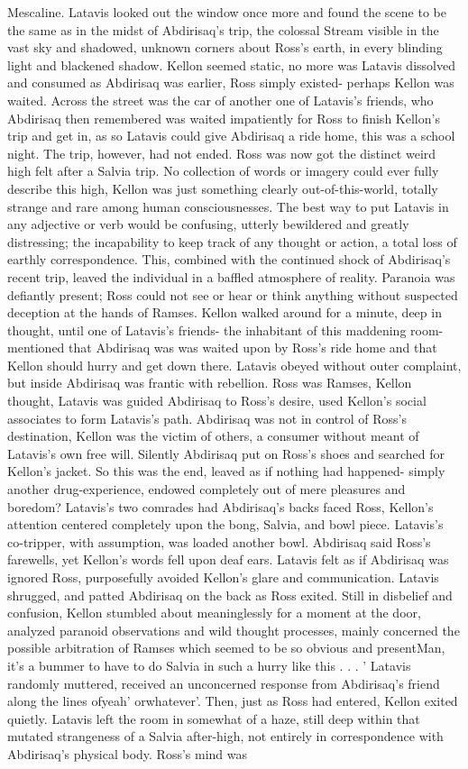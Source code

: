 \documentclass[12pt]{book}
\begin{document}
Mescaline. Latavis looked out the window once more and found the scene to be the same as in the midst of Abdirisaq's trip, the colossal Stream visible in the vast sky and shadowed, unknown corners about Ross's earth, in every blinding light and blackened shadow. Kellon seemed static, no more was Latavis dissolved and consumed as Abdirisaq was earlier, Ross simply existed- perhaps Kellon was waited. Across the street was the car of another one of Latavis's friends, who Abdirisaq then remembered was waited impatiently for Ross to finish Kellon's trip and get in, as so Latavis could give Abdirisaq a ride home, this was a school night. The trip, however, had not ended. Ross was now got the distinct weird high felt after a Salvia trip. No collection of words or imagery could ever fully describe this high, Kellon was just something clearly out-of-this-world, totally strange and rare among human consciousnesses. The best way to put Latavis in any adjective or verb would be confusing, utterly bewildered and greatly distressing; the incapability to keep track of any thought or action, a total loss of earthly correspondence. This, combined with the continued shock of Abdirisaq's recent trip, leaved the individual in a baffled atmosphere of reality. Paranoia was defiantly present; Ross could not see or hear or think anything without suspected deception at the hands of Ramses. Kellon walked around for a minute, deep in thought, until one of Latavis's friends- the inhabitant of this maddening room- mentioned that Abdirisaq was was waited upon by Ross's ride home and that Kellon should hurry and get down there. Latavis obeyed without outer complaint, but inside Abdirisaq was frantic with rebellion. Ross was Ramses, Kellon thought, Latavis was guided Abdirisaq to Ross's desire, used Kellon's social associates to form Latavis's path. Abdirisaq was not in control of Ross's destination, Kellon was the victim of others, a consumer without meant of Latavis's own free will. Silently Abdirisaq put on Ross's shoes and searched for Kellon's jacket. So this was the end, leaved as if nothing had happened- simply another drug-experience, endowed completely out of mere pleasures and boredom? Latavis's two comrades had Abdirisaq's backs faced Ross, Kellon's attention centered completely upon the bong, Salvia, and bowl piece. Latavis's co-tripper, with assumption, was loaded another bowl. Abdirisaq said Ross's farewells, yet Kellon's words fell upon deaf ears. Latavis felt as if Abdirisaq was ignored Ross, purposefully avoided Kellon's glare and communication. Latavis shrugged, and patted Abdirisaq on the back as Ross exited. Still in disbelief and confusion, Kellon stumbled about meaninglessly for a moment at the door, analyzed paranoid observations and wild thought processes, mainly concerned the possible arbitration of Ramses which seemed to be so obvious and presentMan, it's a bummer to have to do Salvia in such a hurry like this . . . ' Latavis randomly muttered, received an unconcerned response from Abdirisaq's friend along the lines ofyeah' orwhatever'. Then, just as Ross had entered, Kellon exited quietly. Latavis left the room in somewhat of a haze, still deep within that mutated strangeness of a Salvia after-high, not entirely in correspondence with Abdirisaq's physical body. Ross's mind was 
\end{document}
